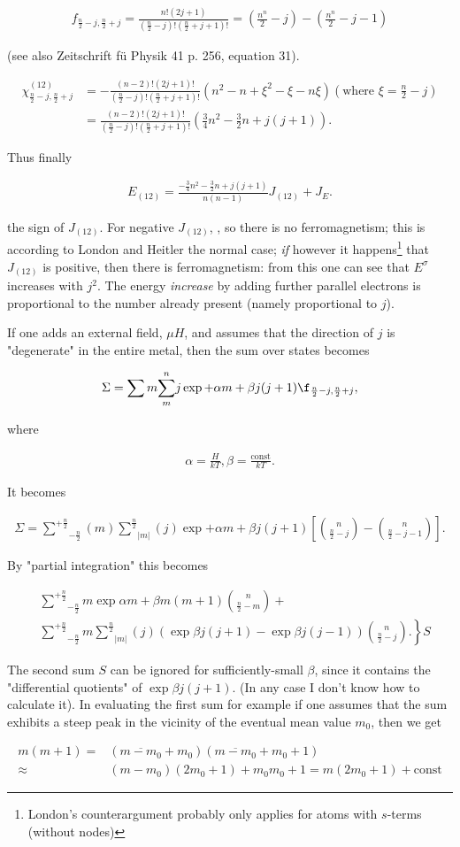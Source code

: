 \documentclass{article}
\newcommand{\uequ}[1]{
\begin{align*}
#1
\end{align*}
}
\newcommand{\sumXY}[2]{\underset{#1}{\overset{#2}{\sum}}}
\begin{document}
\uequ{
f_{\frac{n}{2}-j,\frac{n}{2}+j} = \frac{n!(2j+1)}{(\frac{n}{2}-j)!(\frac{n}{2}+j+1)!}
= \left(\frac{n^n}{2}-j\right) - \left(\frac{n^n}{2} - j - 1\right)
}
(see also Zeitschrift f\"u Physik 41 p. 256, equation 31).
\uequ{
\chi^{(1 2)}_{\frac{n}{2}-j,\frac{n}{2}+j} &=
 -\frac{(n-2)!(2j + 1)!}{\left(\frac{n}{2} - j\right)!\left(\frac{n}{2}+j+1\right)!}
 (n^2 - n + \xi^2 - \xi - n\xi)\left(\text{where } \xi=\frac{n}{2} - j\right)\\
 &= \frac{(n-2)!(2j + 1)!}{\left(\frac{n}{2} - j\right)!\left(\frac{n}{2} + j + 1\right)!}
 \left(\frac{3}{4}n^2 - \frac{3}{2}n + j(j+1) \right).
}
Thus finally
\uequ{
E_{(1 2)} = \frac{-\frac{3}{4}n^2 - \frac{3}{2}n + j(j+1)}{n(n-1)}J_{(1 2)} + J_E .
}
 the sign of $J_{(1 2)}$. For negative $J_{(12)}$, , so there is no ferromagnetism; this is according to London and Heitler the normal case; \textit{if} however it happens\footnote{London's counterargument probably only applies for atoms with $s$-terms (without nodes)} that $J_{(12)}$ is positive, then there is ferromagnetism: from this one can see that $E^\sigma$ increases with $j^2$. The energy \textit{increase} by adding further parallel electrons is proportional to the number already present (namely proportional to $j$).

If one adds an external field, $\mu H$, and assumes that the direction of $j$ is "degenerate" in the entire metal, then the sum over states becomes
\uequ{
\Sigma = \sum m \sumXY{m}{n}j\exp{+\alpha m + \beta j(j+1)} \f_{\frac{n}{2}-j,\frac{n}{2}+j},
}
where
\uequ{
\alpha=\frac{H}{kT}, \beta=\frac{\text{const}}{kT}.
}
It becomes
\uequ{
\Sigma = \sumXY{-\frac{n}{2}}{+\frac{n}{2}}(m)\sumXY{|m|}{\frac{n}{2}}(j)
\exp{+\alpha m + \beta j(j+1)} \left[
\binom{n}{\frac{n}{2}-j} - \binom{n}{\frac{n}{2} - j - 1}
\right].
}

By "partial integration" this becomes
\uequ{
&\sumXY{-\frac{n}{2}}{+\frac{n}{2}}m \exp{\alpha m + \beta m(m+1)}
\binom{n}{\frac{n}{2}-m} + \\
&\left. \sumXY{-\frac{n}{2}}{+\frac{n}{2}}m\sumXY{|m|}{\frac{n}{2}}(j)
\left(\exp{\beta j(j+1)} - \exp{\beta j(j-1)}\right)\binom{n}{\frac{n}{2}-j}.
\right\} S
}

The second sum $S$ can be ignored for sufficiently-small $\beta$, since it contains the "differential quotients" of $\exp{\beta j(j+1)}$. (In any case I don't know how to calculate it). In evaluating the first sum for example if one assumes that the sum exhibits a steep peak in the vicinity of the eventual  mean value $m_0$, then we get
\uequ{
m(m+1) =& (\overline{m-m_0} + m_0)(\overline{m-m_0} + m_0 + 1)\\
\approx & (m-m_0)(2m_0 + 1) + m_0 m_0 + 1 = m(2m_0 + 1) + \text{const}
}
\end{document}
